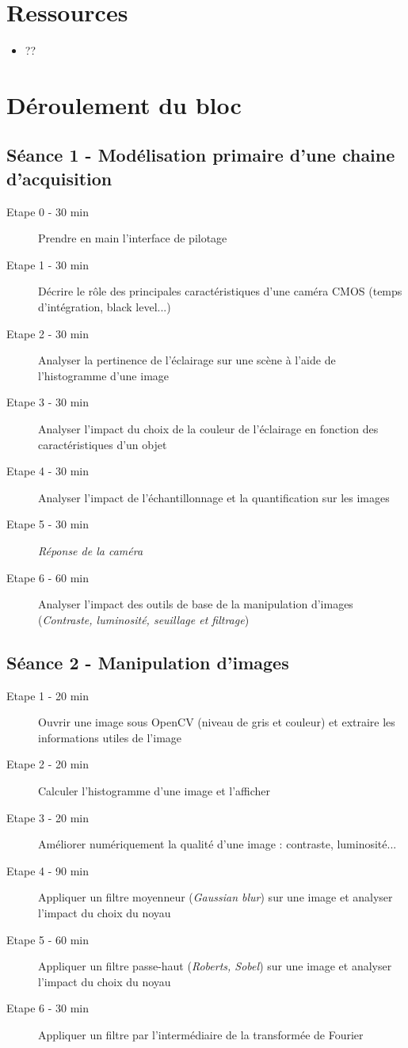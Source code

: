\documentclass[a4paper,11pt,titlepage]{article} %
\begin{document}
\section{Ressources}
\begin{itemize}
	\item ??
\end{itemize}


\newpage
\section{Déroulement du bloc}

\subsection{Séance 1 - Modélisation primaire d'une chaine d'acquisition}
\begin{description}
	\item[Etape 0 - 30 min] Prendre en main l'interface de pilotage
	\item[Etape 1 - 30 min] Décrire le rôle des principales caractéristiques d'une caméra CMOS (temps d'intégration, black level...) 
	\item[Etape 2 - 30 min] Analyser la pertinence de l'éclairage sur une scène à l'aide de l'histogramme d'une image
	\item[Etape 3 - 30 min] Analyser l'impact du choix de la couleur de l'éclairage en fonction des caractéristiques d'un objet
	\item[Etape 4 - 30 min] Analyser l'impact de l'échantillonnage et la quantification sur les images
	\item[Etape 5 - 30 min] \textit{Réponse de la caméra}
	\item[Etape 6 - 60 min] Analyser l'impact des outils de base de la manipulation d'images (\textit{Contraste, luminosité, seuillage et filtrage})
\end{description}
	
\subsection{Séance 2 - Manipulation d'images}
\begin{description}
	\item[Etape 1 - 20 min] Ouvrir une image sous OpenCV (niveau de gris et couleur) et extraire les informations utiles de l'image
	\item[Etape 2 - 20 min] Calculer l'histogramme d'une image et l'afficher
	\item[Etape 3 - 20 min] Améliorer numériquement la qualité d'une image : contraste, luminosité...
	\item[Etape 4 - 90 min] Appliquer un filtre moyenneur (\textit{Gaussian blur}) sur une image et analyser l'impact du choix du noyau
	\item[Etape 5 - 60 min] Appliquer un filtre passe-haut (\textit{Roberts, Sobel}) sur une image et analyser l'impact du choix du noyau
	\item[Etape 6 - 30 min] Appliquer un filtre par l'intermédiaire de la transformée de Fourier
\end{description}
\end{document}
